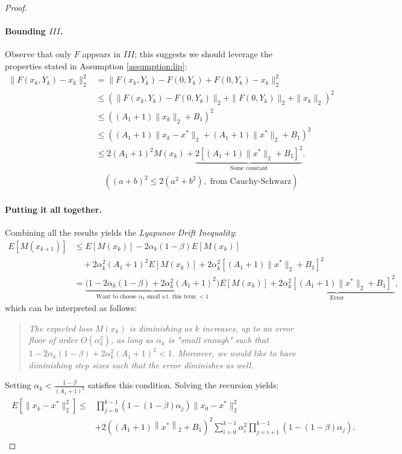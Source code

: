 \documentclass[11pt,twoside]{article}
\begin{document}
\begin{proof}
    \paragraph{Bounding $III$.} Observe that only $F$ appears in $III$; this suggests we should leverage the properties stated in Assumption \ref{assumption:lip}: 
    \begin{align*}
        \| F(x_k,Y_k) - x_k\|_2^2 &= \| F(x_k,Y_k) - F(0,Y_k) + F(0,Y_k) - x_k\|_2^2 \\
        & \leq (\| F(x_k,Y_k) - F(0,Y_k)\|_2 + \|F(0,Y_k)\|_2 +\|x_k\|_2)^2 \\
        &\leq ((A_1+1) \|x_k\|_2 + B_1)^2 \\
        & \leq ((A_1+1) \|x_k-x^*\|_2  + (A_1+1)\|x^*\|_2+ B_1)^2 \\
        & \leq 2(A_1+1)^2 M(x_k)  + \underbrace{2[(A_1+1)\|x^*\|_2+ B_1]^2}_{\text{Some constant}}. \\
        & \quad{((a+b)^2 \leq 2(a^2+b^2), \text{ from Cauchy-Schwarz})}
    \end{align*}

    \paragraph{Putting it all together.} Combining all the results yields the \emph{Lyapunov Drift Inequality}:
    \begin{align*}
        E[M(x_{k+1})] &\leq E[M(x_k)] - 2\alpha_k(1-\beta)E[M(x_k)] \\
        &\quad + 2\alpha_k^2(A_1+1)^2 E[M(x_k)] + 2\alpha_k^2[(A_1+1)\|x^*\|_2+ B_1]^2 \\
        & = \underbrace{\big(1-2\alpha_k(1-\beta)+2\alpha_k^2(A_1+1)^2\big)}_{\text{Want to choose $\alpha_k$ small s.t. this term $<1$}} E[M(x_k)] + \underbrace{2\alpha_k^2[(A_1+1)\|x^*\|_2+ B_1]^2}_{\text{Error}}, 
    \end{align*}
    which can be interpreted as follows: 
    \begin{quote}
        \emph{The expected loss $M(x_k)$ is diminishing as $k$ increases, up to an error floor of order $O(\alpha_k^2)$, as long as $\alpha_k$ is "small enough" such that $1-2\alpha_k(1-\beta)+2\alpha_k^2(A_1+1)^2 < 1$. Moreover, we would like to have diminishing step sizes such that the error diminishes as well.}
    \end{quote}
    Setting $\alpha_k < \frac{1-\beta}{(A_1+1)^2}$ satisfies this condition. Solving the recursion yields:
    \begin{align}
    \begin{aligned}
    {E}\left[\|x_k-x^*\|_2^2\right] \leq & \prod_{j=0}^{k-1}\left(1-(1-\beta) \alpha_j\right) \|x_0-x^*\|_2^2 \\
    & +2\left(\left(A_1+1\right)\left\|x^*\right\|_2+B_1\right)^2 \sum_{i=0}^{k-1} \alpha_i^2 \prod_{j=i+1}^{k-1}\left(1-(1-\beta) \alpha_j\right) .
    \end{aligned}
    \end{align}
\end{proof}
\end{document}
